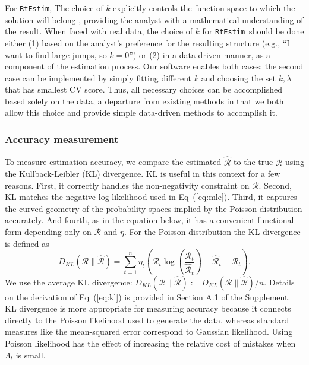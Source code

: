 \documentclass[10pt,letterpaper]{article}
\newcommand{\lr}[1]{\left(#1\right)}
\def\RtEstim{\texttt{RtEstim}}
\def\calR{\mathcal{R}}
\renewcommand{\eqref}[1]{Eq~(\ref{#1})}
\begin{document}
For \RtEstim, The choice of $k$ explicitly controls the function space to which
the solution will belong \cite{tibshirani2022divided}, providing the analyst
with a mathematical understanding of the result. When faced with real data, the
choice of $k$ for \RtEstim\ should be done either (1) based on the analyst's
preference for the resulting structure (e.g., ``I want to find large jumps, so
$k=0$'') or (2) in a data-driven manner, as a component of the estimation
process.  Our software enables both cases: the second case can be implemented by
simply fitting different $k$ and choosing the set $k,\lambda$ that has smallest
CV score. Thus, all necessary choices can be accomplished based solely on the
data, a departure from existing methods in that we both allow this choice and
provide simple data-driven methods to accomplish it.

\subsubsection{Accuracy measurement}

To measure estimation accuracy, we compare the estimated $\widehat{\calR}$ to
the true $\calR$ using the Kullback-Leibler (KL) divergence. KL is useful in
this context for a few reasons. First, it correctly handles the non-negativity
constraint on $\calR$. Second, KL matches the negative log-likelihood used in
\eqref{eq:mle}. Third, it captures the curved geometry of the probability spaces
implied by the Poisson distribution accurately. And fourth, as in the equation
below, it has a convenient functional form depending only on $\calR$ and $\eta$.
For the Poisson distribution the KL divergence is defined as
\begin{equation} \label{eq:kl}
  D_{KL}(\calR \parallel \widehat{\calR}) = \sum_{t=1}^n \eta_t \lr{\calR_t
  \log\left(\frac{\calR_t} {\widehat{\calR}_t}\right) + \widehat{\calR}_t -
{\calR}_t}.
\end{equation}
We use the average KL divergence: $\overline{D}_{KL}(\calR \parallel
\widehat{\calR}) := D_{KL}(\calR \parallel \widehat{\calR}) / n$. Details on the
derivation of \eqref{eq:kl} is provided in Section A.1 of the Supplement. KL
divergence is more appropriate for measuring accuracy because it connects
directly to the Poisson likelihood used to generate the data, whereas standard
measures like the mean-squared error correspond to Gaussian likelihood. Using
Poisson likelihood has the effect of increasing the relative cost of mistakes
when $\Lambda_t$ is small. 
\end{document}
